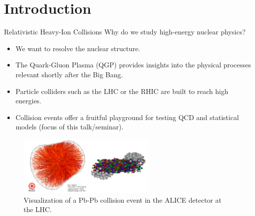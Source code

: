 \section{Introduction}

\begin{frame}{Relativistic Heavy-Ion Collisions}
\vspace{0.5em}
Why do we study high-energy nuclear physics? \\[0.5em]

\begin{itemize}
    \item  We want to resolve the nuclear structure.
	\item The \alert{Quark-Gluon Plasma} (QGP) provides insights into the physical processes relevant shortly after the Big Bang.
	\item Particle colliders such as the \alert{LHC} or the \alert{RHIC} are built to reach high energies.
	\item Collision events offer a fruitful playground for testing \alert{QCD} and \alert{statistical models} (focus of this talk/seminar).	
\end{itemize}
\begin{figure}[H]
\centering
\includegraphics[width = 0.6\textwidth]{figures/introduction}
\caption{Visualization of a Pb-Pb collision event in the ALICE detector at the LHC.\footnotemark}	
\end{figure}
\end{frame}

